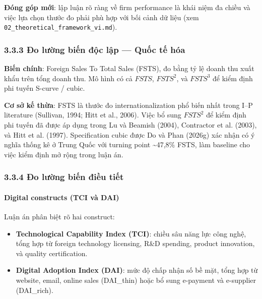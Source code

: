 \documentclass[12pt,a4paper]{article}
\providecommand{\tightlist}{\setlength{\itemsep}{0pt}\setlength{\parskip}{0pt}}
\begin{document}
\textbf{Đóng góp mới}: lập luận rõ ràng về firm performance là khái niệm
đa chiều và việc lựa chọn thước đo phải phù hợp với bối cảnh dữ liệu
(xem \texttt{02\_theoretical\_framework\_vi.md}).

\hypertarget{333-ux111o-lux1b0ux1eddng-biux1ebfn-ux111ux1ed9c-lux1eadp--quux1ed1c-tux1ebf-huxf3a}{%
\subsubsection{3.3.3 Đo lường biến độc lập --- Quốc tế
hóa}\label{333-ux111o-lux1b0ux1eddng-biux1ebfn-ux111ux1ed9c-lux1eadp--quux1ed1c-tux1ebf-huxf3a}}

\textbf{Biến chính}: Foreign Sales To Total Sales (FSTS), đo bằng tỷ lệ
doanh thu xuất khẩu trên tổng doanh thu. Mô hình có cả \(FSTS\),
\(FSTS^2\), và \(FSTS^3\) để kiểm định phi tuyến S-curve / cubic.

\textbf{Cơ sở kế thừa}: FSTS là thước đo internationalization phổ biến
nhất trong I--P literature (Sullivan, 1994; Hitt et al., 2006). Việc bổ
sung \(FSTS^2\) để kiểm định phi tuyến đã được áp dụng trong Lu và
Beamish (2004), Contractor et al. (2003), và Hitt et al. (1997).
Specification cubic được Do và Phan (2026g) xác nhận có ý nghĩa thống kê
ở Trung Quốc với turning point \textasciitilde47,8\% FSTS, làm baseline
cho việc kiểm định mở rộng trong luận án.

\hypertarget{334-ux111o-lux1b0ux1eddng-biux1ebfn-ux111iux1ec1u-tiux1ebft}{%
\subsubsection{3.3.4 Đo lường biến điều
tiết}\label{334-ux111o-lux1b0ux1eddng-biux1ebfn-ux111iux1ec1u-tiux1ebft}}

\hypertarget{digital-constructs-tci-vuxe0-dai}{%
\paragraph{Digital constructs (TCI và
DAI)}\label{digital-constructs-tci-vuxe0-dai}}

Luận án phân biệt rõ hai construct:

\begin{itemize}
\tightlist
\item
  \textbf{Technological Capability Index (TCI)}: chiều sâu năng lực công
  nghệ, tổng hợp từ foreign technology licensing, R\&D spending, product
  innovation, và quality certification.
\item
  \textbf{Digital Adoption Index (DAI)}: mức độ chấp nhận số bề mặt,
  tổng hợp từ website, email, online sales (DAI\_thin) hoặc bổ sung
  e-payment và e-supplier (DAI\_rich).
\end{itemize}
\end{document}
